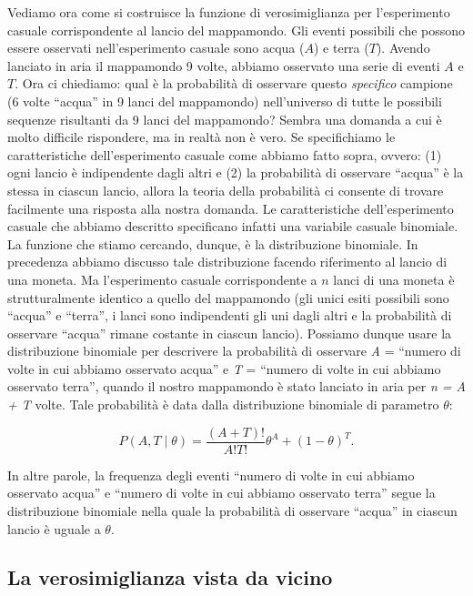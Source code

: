 \documentclass[
]{memoir}
\theoremstyle{definition}
\theoremstyle{definition}
\theoremstyle{definition}
\theoremstyle{definition}
\theoremstyle{remark}
\begin{document}
Vediamo ora come si costruisce la funzione di verosimiglianza per l'esperimento casuale corrispondente al lancio del mappamondo. Gli eventi possibili che possono essere osservati nell'esperimento casuale sono acqua (\(A\)) e terra (\(T\)). Avendo lanciato in aria il mappamondo 9 volte, abbiamo osservato una serie di eventi \(A\) e \(T\). Ora ci chiediamo: qual è la probabilità di osservare questo \emph{specifico} campione (6 volte ``acqua'' in 9 lanci del mappamondo) nell'universo di tutte le possibili sequenze risultanti da 9 lanci del mappamondo? Sembra una domanda a cui è molto difficile rispondere, ma in realtà non è vero. Se specifichiamo le caratteristiche dell'esperimento casuale come abbiamo fatto sopra, ovvero: (1) ogni lancio è indipendente dagli altri e (2) la probabilità di osservare ``acqua'' è la stessa in ciascun lancio, allora la teoria della probabilità ci consente di trovare facilmente una risposta alla nostra domanda. Le caratteristiche dell'esperimento casuale che abbiamo descritto specificano infatti una variabile casuale binomiale. La funzione che stiamo cercando, dunque, è la distribuzione binomiale. In precedenza abbiamo discusso tale distribuzione facendo riferimento al lancio di una moneta. Ma l'esperimento casuale corrispondente a \(n\) lanci di una moneta è strutturalmente identico a quello del mappamondo (gli unici esiti possibili sono ``acqua'' e ``terra'', i lanci sono indipendenti gli uni dagli altri e la probabilità di osservare ``acqua'' rimane costante in ciascun lancio). Possiamo dunque usare la distribuzione binomiale per descrivere la probabilità di osservare \emph{A} = ``numero di volte in cui abbiamo osservato acqua'' e \emph{T} = ``numero di volte in cui abbiamo osservato terra'', quando il nostro mappamondo è stato lanciato in aria per \emph{n = A + T} volte. Tale probabilità è data dalla distribuzione binomiale di parametro \(\theta\):

\begin{equation}
P(A, T \mid \theta) = \frac{(A + T)!}{A!T!} \theta^A + (1-\theta)^T.
\label{eq:binomwater}
\end{equation}

In altre parole, la frequenza degli eventi ``numero di volte in cui abbiamo osservato acqua'' e ``numero di volte in cui abbiamo osservato terra'' segue la distribuzione binomiale nella quale la probabilità di osservare ``acqua'' in ciascun lancio è uguale a \(\theta\).

\hypertarget{la-verosimiglianza-vista-da-vicino}{%
\subsection{La verosimiglianza vista da vicino}\label{la-verosimiglianza-vista-da-vicino}}
\end{document}
